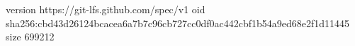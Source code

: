 version https://git-lfs.github.com/spec/v1
oid sha256:cbd43d26124bcacea6a7b7c96cb727cc0df0ac442cbf1b54a9ed68e2f1d11445
size 699212

